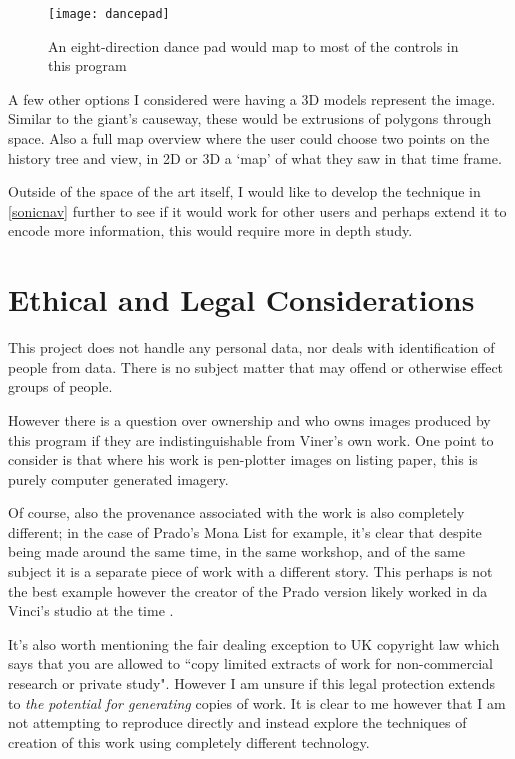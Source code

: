 \begin{figure}[H]
    \centering
    \texttt{[image: dancepad]}
    \caption{An eight-direction dance pad would map to most of the controls in
    this program}
\end{figure}

A few other options I considered were having a 3D models represent the image.
Similar to the giant's causeway, these would be extrusions of polygons through
space. Also a full map overview where the user could choose two points on the
history tree and view, in 2D or 3D a `map' of what they saw in that time frame.

Outside of the space of the art itself, I would like to develop the technique in
\autoref{sonicnav} further to see if it would work for other users and perhaps
extend it to encode more information, this would require more in depth study.

\section{Ethical and Legal Considerations}
This project does not handle any personal data, nor deals with identification of
people from data. There is no subject matter that may offend or otherwise effect
groups of people. 

However there is a question over ownership and who owns images produced by this
program if they are indistinguishable from Viner's own work.  One point to
consider is that where his work is pen-plotter images on listing paper, this is
purely computer generated imagery. 

Of course, also the provenance associated with the work is also completely
different; in the case of Prado's Mona List for example, it's clear that despite
being made around the same time, in the same workshop, and of the same subject
it is a separate piece of work with a different story. This perhaps is not the
best example however the creator of the Prado version likely worked in da
Vinci's studio at the time \citep{museodelprado_MonaLisa}. 

It's also worth mentioning the fair dealing exception to UK copyright law which
says that you are allowed to ``copy limited extracts of work for non-commercial
research or private study"\citep{govuk_copyright}. However I am unsure if this
legal protection extends to \emph{the potential for generating} copies of work.
It is clear to me however that I am not attempting to reproduce directly and
instead explore the techniques of creation of this work using completely
different technology.
